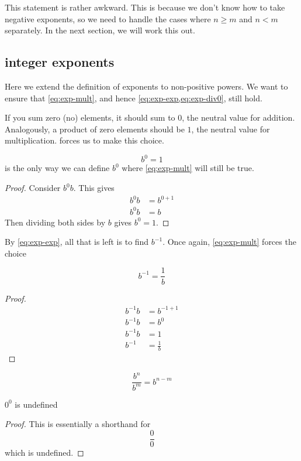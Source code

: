 \documentclass[10pt]{scrartcl}
\begin{document}
This statement is rather awkward. This is because we don't know how to take negative exponents, so we need to handle the cases where $n\geq m$ and $n<m$ separately. In the next section, we will work this out.

\subsection{integer exponents}
 Here we extend the definition of exponents to non-positive powers. We want to ensure that \cref{eq:exp-mult}, and hence \cref{eq:exp-exp,eq:exp-div0}, still hold. 

If you sum zero (no) elements, it should sum to $0$, the neutral value for addition. Analogously, a product of zero elements should be $1$, the neutral value for multiplication.  forces us to make this choice. 
\begin{theorem}
  \[
  b^0 = 1
  \]
  is the only way we can define $b^0$ where \cref{eq:exp-mult} will still be true.
\end{theorem}
\begin{proof}
  Consider $b^0b$. This gives
  \begin{align*}
    b^0b&=b^{0+1}\\
    b^0b&=b
  \end{align*}
  Then dividing both sides by $b$ gives $b^0=1$. 
\end{proof}

By \cref{eq:exp-exp}, all that is left is to find $b^{-1}$. Once again, \cref{eq:exp-mult} forces the choice 
\begin{theorem}
  \[
  b^{-1}=\frac 1 b
  \]
\end{theorem}
\begin{proof}
  \begin{align*}
    b^{-1}b &= b^{-1+1} \\
    b^{-1}b &= b^0 \\
    b^{-1}b&= 1 \\
    b^{-1}&=\frac 1 b
  \end{align*}
\end{proof}
\begin{theorem}
  \begin{equation}
    \frac{b^n}{b^m}=b^{n-m}\label{eq:exp-div}
  \end{equation}
  \label{th:exp-div}
\end{theorem}
\begin{theorem}
  $0^0$ is undefined
\end{theorem}
\begin{proof}
  This is essentially a shorthand for
  \[
  \frac{0}{0}
  \]
  which is undefined. 
\end{proof}
\end{document}
